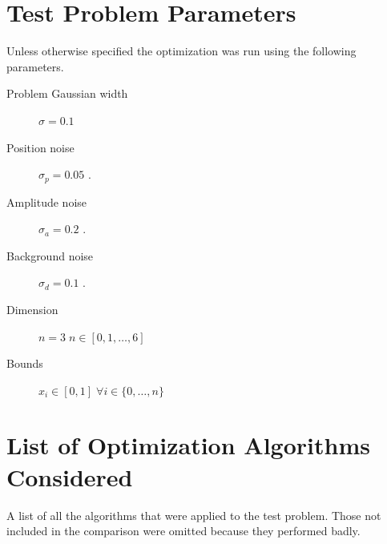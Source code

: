 \documentclass[a4paper,titlepage]{report}
\begin{document}
\section{Test Problem Parameters}
\label{sec:param}

Unless otherwise specified the optimization was run using the following parameters.

\begin{description}
\item[Problem Gaussian width] $\sigma   = 0.1 $ 
\item[Position noise]         $\sigma_p = 0.05$ .
\item[Amplitude noise]        $\sigma_a = 0.2 $ .
\item[Background noise]       $\sigma_d = 0.1 $ .
\item[Dimension]           $n=3\; n \in [0,1,\dots,6]$
\item[Bounds]              $x_i \in [0,1]\; \forall i \in \{0,\dots,n\}$
\end{description}


\section{List of Optimization Algorithms Considered}

A list of all the algorithms that were applied to the test problem. Those not included in the comparison were omitted because they performed badly.
\end{document}
